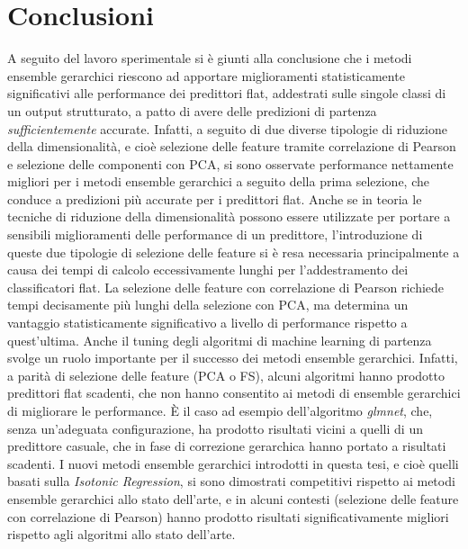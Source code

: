 \documentclass[12pt]{report}
\begin{document}
\chapter{Conclusioni}
A seguito del lavoro sperimentale si è giunti alla conclusione che i metodi ensemble gerarchici riescono ad apportare miglioramenti statisticamente significativi alle performance dei predittori flat, addestrati sulle singole classi di un output strutturato, a patto di avere delle predizioni di partenza \emph{sufficientemente} accurate. Infatti, a seguito di due diverse tipologie di riduzione della dimensionalità, e cioè selezione delle feature tramite correlazione di Pearson e selezione delle componenti con PCA, si sono osservate performance nettamente migliori per i metodi ensemble gerarchici a seguito della prima selezione, che conduce a predizioni più accurate per i predittori flat. 
\newline
\newline
Anche se in teoria le tecniche di riduzione della dimensionalità possono essere utilizzate per portare a sensibili miglioramenti delle performance di un predittore, l'introduzione di queste due tipologie di selezione delle feature si è resa necessaria principalmente a causa dei tempi di calcolo eccessivamente lunghi per l'addestramento dei classificatori flat. La selezione delle feature con correlazione di Pearson richiede tempi decisamente più lunghi della selezione con PCA, ma determina un vantaggio statisticamente significativo a livello di performance rispetto a quest'ultima.
\newline
\newline
Anche il tuning degli algoritmi di machine learning di partenza svolge un ruolo importante per il successo dei metodi ensemble gerarchici. Infatti, a parità di selezione delle feature (PCA o FS), alcuni algoritmi hanno prodotto predittori flat scadenti, che non hanno consentito ai metodi di ensemble gerarchici di migliorare le performance. È il caso ad esempio dell'algoritmo \emph{glmnet}, che, senza un'adeguata configurazione, ha prodotto risultati vicini a quelli di un predittore casuale, che in fase di correzione gerarchica hanno portato a risultati scadenti.
\newline
\newline
I nuovi metodi ensemble gerarchici introdotti in questa tesi, e cioè quelli basati sulla \emph{Isotonic Regression}, si sono dimostrati competitivi rispetto ai metodi  ensemble gerarchici allo stato dell'arte, e in alcuni contesti (selezione delle feature con correlazione di Pearson) hanno prodotto risultati significativamente migliori rispetto agli algoritmi allo stato dell'arte.
\end{document}
